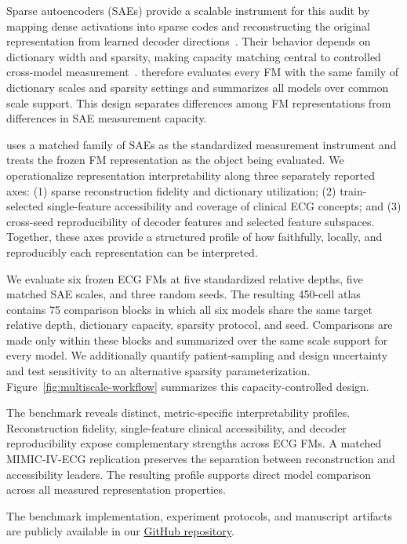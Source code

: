 Sparse autoencoders (SAEs) provide a scalable instrument for this audit by mapping dense activations into sparse codes and reconstructing the original representation from learned decoder directions~\cite{cunningham2024sae,gao2025scaling,bussmann2024batchtopk}. Their behavior depends on dictionary width and sparsity, making capacity matching central to controlled cross-model measurement~\cite{templeton2024scaling,lieberum2024gemmascope,makelov2025principled}. \bench{} therefore evaluates every FM with the same family of dictionary scales and sparsity settings and summarizes all models over common scale support. This design separates differences among FM representations from differences in SAE measurement capacity.

\bench{} uses a matched family of SAEs as the standardized measurement instrument and treats the frozen FM representation as the object being evaluated. We operationalize representation interpretability along three separately reported axes: (1) sparse reconstruction fidelity and dictionary utilization; (2) train-selected single-feature accessibility and coverage of clinical ECG concepts; and (3) cross-seed reproducibility of decoder features and selected feature subspaces. Together, these axes provide a structured profile of how faithfully, locally, and reproducibly each representation can be interpreted.

We evaluate six frozen ECG FMs at five standardized relative depths, five matched SAE scales, and three random seeds. The resulting 450-cell atlas contains 75 comparison blocks in which all six models share the same target relative depth, dictionary capacity, sparsity protocol, and seed. Comparisons are made only within these blocks and summarized over the same scale support for every model. We additionally quantify patient-sampling and design uncertainty and test sensitivity to an alternative sparsity parameterization. Figure~\ref{fig:multiscale-workflow} summarizes this capacity-controlled design.

The benchmark reveals distinct, metric-specific interpretability profiles. Reconstruction fidelity, single-feature clinical accessibility, and decoder reproducibility expose complementary strengths across ECG FMs. A matched MIMIC-IV-ECG replication preserves the separation between reconstruction and accessibility leaders. The resulting profile supports direct model comparison across all measured representation properties.

The benchmark implementation, experiment protocols, and manuscript artifacts are publicly available in our \href{https://github.com/JayDuan123/2027-kdd-ECG-InterpBench}{GitHub repository}.

